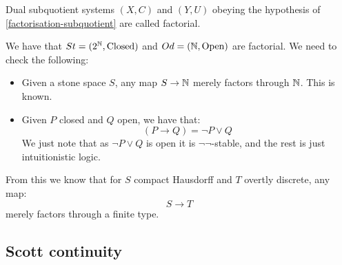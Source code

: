 \begin{definition}
Dual subquotient systems $(X,C)$ and $(Y,U)$ obeying the hypothesis of \cref{factorisation-subquotient} are called factorial.
\end{definition}

\begin{remark}
We have that $St = (2^{\mathbb{N}},\mathrm{Closed})$ and $Od = (\mathbb{N},\mathrm{Open})$ are factorial. We need to check the following:
\begin{itemize}
\item Given a stone space $S$, any map $S\to\mathbb{N}$ merely factors through $\mathbb{N}$. This is known.
\item Given $P$ closed and $Q$ open, we have that:
\[(P\to Q) = \neg P \lor Q\]
We just note that as $\neg P \lor Q$ is open it is $\neg\neg$-stable, and the rest is just intuitionistic logic.
\end{itemize}
From this we know that for $S$ compact Hausdorff and $T$ overtly discrete, any map:
\[S\to T\]
merely factors through a finite type. 
\end{remark}

\subsection{Scott continuity}



